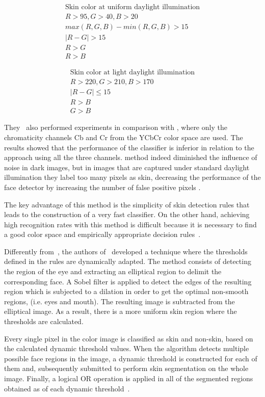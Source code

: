 \begin{align*}
\text{Skin color at uniform daylight illumination}\\
R > 95, G > 40, B > 20 \\
max(R, G, B) - min(R, G, B) > 15 \\
|R - G| > 15 \\
R > G \\
R > B
\end{align*}

\begin{align*}
\text{Skin color at light daylight illumination}\\
R > 220, G > 210, B > 170 \\
|R - G| \leq 15 \\
R > B \\
G > B
\end{align*}

They~\citep{kovac:03} also performed experiments in comparison with \citet{hsu:02}, where only the chromaticity channels Cb and Cr from the YCbCr color space are used. The results showed that the performance of the classifier is inferior in relation to the approach using all the three channels. \citet{hsu:02} method indeed diminished the influence of noise in dark images, but in images that are captured under standard daylight illumination they label too many pixels as skin, decreasing the performance of the face detector by increasing the number of false positive pixels \citep{kovac:03}.

The key advantage of this method is the simplicity of skin detection rules that leads to the construction of a very fast classifier. On the other hand, achieving high recognition rates with this method is difficult because it is necessary to find a good color space and empirically appropriate decision rules~\citep{vezhnevets:03}.

Differently from~\citet{kovac:03}, the authors of~\citet{yogarajah:11} developed a technique where the thresholds defined in the rules are dynamically adapted. The method consists of detecting the region of the eye and extracting an elliptical region to delimit the corresponding face. A Sobel filter is applied to detect the edges of the resulting region which is subjected to a dilation in order to get the optimal non-smooth regions, (i.e. eyes and mouth). The resulting image is subtracted from the elliptical image. As a result, there is a more uniform skin region where the thresholds are calculated.

Every single pixel in the color image is classified as skin and non-skin, based on the calculated dynamic threshold values. When the algorithm detects multiple possible face regions in the image, a dynamic threshold is constructed for each of them and, subsequently submitted to perform skin segmentation on the whole image. Finally, a logical OR operation is applied in all of the segmented regions obtained as of each dynamic threshold~\citep{yogarajah:11}.

